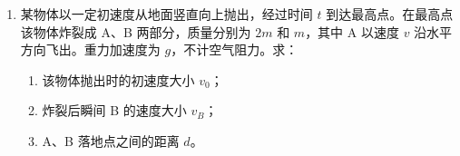 \documentclass[\gkver]{gaokaozhenti}
\begin{document}
\begin{enumerate}
{（2）小车做匀加速直线运动时，速度越来越大，纸带上点间距逐渐增大。图 2 中纸带左端间距小，右端间距大，说明纸带左端与小车相连。

（3）根据匀变速直线运动中，中间时刻的瞬时速度等于该段时间内的平均速度。B 点为 A、C 的中间时刻，AC 间位移为 $x_{2}$，时间间隔为 $2T$；则 $v = \frac{x_{2}}{2T}$。

（4）根据逐差法可知 $a = \frac{x_{CE} - x_{AC}}{4T^{2}} = \frac{0.1924 - 0.0800 \times 2}{4 \times 0.1^{2}} \Umsq = 0.81 \Umsq$

B 点是 AC 的中间时刻点，则有

$v_{B} = \frac{x_{AC}}{2T} = \frac{0.0800}{2 \times 0.1} \Ums = 0.4 \Ums$

此时向心加速度 $a_{n} = \frac{v_{B}^{2}}{R} = \frac{0.4^{2}}{0.1} \Umsq = 1.6 \Umsq$
}

\item
某物体以一定初速度从地面竖直向上抛出，经过时间 $t$ 到达最高点。在最高点该物体炸裂成 A、B 两部分，质量分别为 $2m$ 和 $m$，其中 A 以速度 $v$ 沿水平方向飞出。重力加速度为 $g$，不计空气阻力。求：
\begin{enumerate}
	\item
	该物体抛出时的初速度大小 $v_{0}$；
	\item
	炸裂后瞬间 B 的速度大小 $v_{B}$；
	\item
	A、B 落地点之间的距离 $d$。
\end{enumerate}



\end{enumerate}
\end{document}
